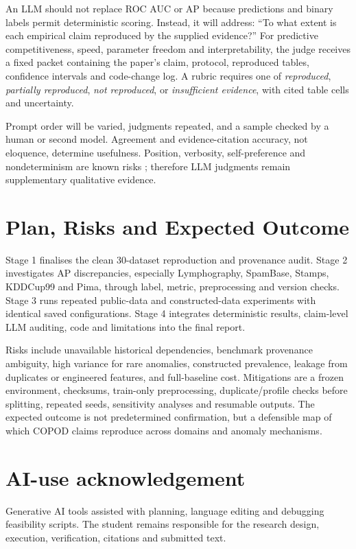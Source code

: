 \documentclass[11pt,a4paper,twocolumn]{article}
\newif\ifofficialacl
\begin{document}
An LLM should not replace ROC AUC or AP because predictions and binary labels permit deterministic scoring. Instead, it will address: ``To what extent is each empirical claim reproduced by the supplied evidence?'' For predictive competitiveness, speed, parameter freedom and interpretability, the judge receives a fixed packet containing the paper's claim, protocol, reproduced tables, confidence intervals and code-change log. A rubric requires one of \emph{reproduced}, \emph{partially reproduced}, \emph{not reproduced}, or \emph{insufficient evidence}, with cited table cells and uncertainty.

Prompt order will be varied, judgments repeated, and a sample checked by a human or second model. Agreement and evidence-citation accuracy, not eloquence, determine usefulness. Position, verbosity, self-preference and nondeterminism are known risks \citep{zheng2023}; therefore LLM judgments remain supplementary qualitative evidence.

\section{Plan, Risks and Expected Outcome}

Stage 1 finalises the clean 30-dataset reproduction and provenance audit. Stage 2 investigates AP discrepancies, especially Lymphography, SpamBase, Stamps, KDDCup99 and Pima, through label, metric, preprocessing and version checks. Stage 3 runs repeated public-data and constructed-data experiments with identical saved configurations. Stage 4 integrates deterministic results, claim-level LLM auditing, code and limitations into the final report.

Risks include unavailable historical dependencies, benchmark provenance ambiguity, high variance for rare anomalies, constructed prevalence, leakage from duplicates or engineered features, and full-baseline cost. Mitigations are a frozen environment, checksums, train-only preprocessing, duplicate/profile checks before splitting, repeated seeds, sensitivity analyses and resumable outputs. The expected outcome is not predetermined confirmation, but a defensible map of which COPOD claims reproduce across domains and anomaly mechanisms.

\section*{AI-use acknowledgement}
Generative AI tools assisted with planning, language editing and debugging feasibility scripts. The student remains responsible for the research design, execution, verification, citations and submitted text.

\balance
\ifofficialacl
\else
  
\fi

\end{document}
